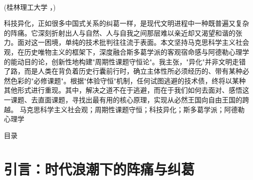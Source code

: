 \documentclass[a4paper,12pt]{ctexart}
\begin{document}
\makeCoverPage

\begin{center}
    {\heiti \getPaperTitleLineA \getPaperTitleLineB}
\end{center}

\begin{center}
    \vspace{-0.5em}
    \setlength{\baselineskip}{23pt} 
    {\kaishu \getStudentName} \\
    {\kaishu (桂林理工大学 \getStudentCollege，\getStudentLocation)}
\end{center}

\vspace{1em}

\begin{PaperAbstract}{
科技异化，正如很多中国式关系的纠葛一样，是现代文明进程中一种既普遍又复杂的阵痛。它深刻折射出人与自然、人与自我之间那层难以亲近却又渴望和谐的张力。面对这一困境，单纯的技术批判往往流于表面。本文坚持马克思科学主义社会观，在历史唯物主义的框架下，深度融合斯多葛学派的客观宿命感与阿德勒心理学的能动目的论，创新性地构建"周期性课题守恒论"。我主张，"异化"并非文明走错了路，而是人类在背负着历史行囊前行时，确立主体性所必须经历的、带有某种必然色彩的"必修课题"。根据"体验守恒"机制，任何试图逃避的技术债，终将以某种其他形式进行重现。其中，解决之道不在于逃避，而在于我们如何去面对、感悟这一课题、去直面课题，寻找出最有用的核心原理，实现从必然王国向自由王国的跨越。
}
马克思科学主义社会观；周期性课题守恒；科技异化；斯多葛学派；阿德勒心理学
\end{PaperAbstract}

\newpage
{}
\begin{center}
    \heiti 目\quad 录
\end{center}
\vspace{1em}
\makeatletter
{}
\makeatother
\newpage
{}

\songti
\setlength{\baselineskip}{23pt}
\setlength{\parindent}{2em} 

\section{引言：时代浪潮下的阵痛与纠葛}
\end{document}
